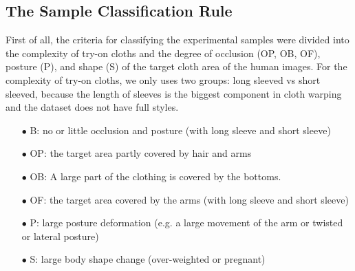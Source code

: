 
 
\subsection{The Sample Classification Rule}

First of all, the criteria for classifying the experimental samples were divided into the complexity of try-on cloths and the degree of occlusion (OP, OB, OF), posture (P), and shape (S) of the target cloth area of the human images. For the complexity of try-on cloths, we only uses two groups: long sleeved vs short sleeved, because the length of sleeves is the biggest component in cloth warping and the dataset does not have full styles.    



\begin{itemize}

\item[$\bullet$] B:  no or little occlusion and posture (with long sleeve and  short sleeve)
\item[$\bullet$] OP: the target area partly covered by hair and arms
\item[$\bullet$] OB: A large part of the clothing is covered by the bottoms.
\item[$\bullet$] OF: the target area covered by the arms (with long sleeve and short sleeve)
\item[$\bullet$] P:  large posture deformation (e.g. a large movement of the arm or twisted or lateral posture)
\item[$\bullet$] S:  large body shape change  (over-weighted or pregnant)

\end{itemize}

